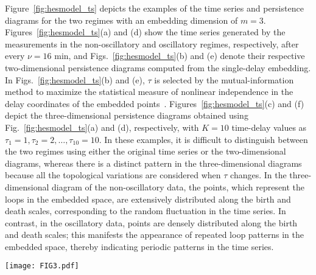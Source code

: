 \documentclass[twocolumn,pre,amsmath,amssymb]{revtex4-1}
\begin{document}
Figure~\ref{fig:hesmodel_ts} depicts the examples of the time series and persistence diagrams 
for the two regimes with an embedding dimension of $m=3$. 
Figures~\ref{fig:hesmodel_ts}(a) and (d) show the time series generated by the measurements 
in the non-oscillatory and oscillatory regimes, respectively, after every $\nu=16$ min,
and Figs.~\ref{fig:hesmodel_ts}(b) and (e) denote their respective two-dimensional persistence diagrams 
computed from the single-delay embedding.
In Figs.~\ref{fig:hesmodel_ts}(b) and (e), $\tau$ 
is selected by the mutual-information method
to maximize the statistical measure of nonlinear independence 
in the delay coordinates of the embedded points~\cite{fraser:pra:1986}.
Figures~\ref{fig:hesmodel_ts}(c) and (f) depict the three-dimensional 
persistence diagrams obtained using Fig.~\ref{fig:hesmodel_ts}(a) and (d), respectively, 
with $K=10$ time-delay values as $\tau_1=1,\tau_2=2,\ldots,\tau_{10}=10$.
In these examples, it is difficult to distinguish between the two regimes 
using either the original time series or the two-dimensional diagrams, 
whereas there is a distinct pattern in the three-dimensional diagrams 
because all the topological variations are considered when $\tau$ changes. 
In the three-dimensional diagram of the non-oscillatory data, the points,
which represent the loops in the embedded space,
are extensively distributed along the birth and death scales, 
corresponding to the random fluctuation in the time series.
In contrast, in the oscillatory data,
points are densely distributed along the birth and death scales;
this manifests the appearance of repeated loop patterns in the embedded space,
thereby indicating periodic patterns in the time series.
\begin{figure*}
	\texttt{[image: FIG3.pdf]}
	\protect\caption{(a)(d) Examples of two time series generated from the (a) non-oscillatory and (d) oscillatory regimes of the Hes1 model measured after every 16 min.
		(b)(e) Two-dimensional persistence diagrams of the loop patterns calculated with embedding dimension $m=3$ and a single value of $\tau$  
		selected according to~\cite{fraser:pra:1986}
        for the (b) non-oscillatory ($\tau=4$) and (e) oscillatory ($\tau=2$) time series.
		(c)(f) Three-dimensional persistence diagrams of loop patterns calculated with $m=3$ and $10$ values of $\tau$ given by $\tau_1=1, \tau_2=2, \ldots, \tau_{10}=10$ for the (c) non-oscillatory and (f) oscillatory time series.
		\label{fig:hesmodel_ts}}
\end{figure*}
\end{document}
